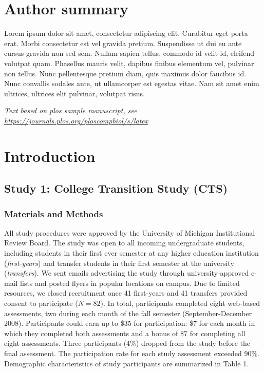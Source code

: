 \documentclass[10pt,letterpaper]{article}
\begin{document}
\section*{Author summary}
Lorem ipsum dolor sit amet, consectetur adipiscing elit. Curabitur eget
porta erat. Morbi consectetur est vel gravida pretium. Suspendisse ut
dui eu ante cursus gravida non sed sem. Nullam sapien tellus, commodo id
velit id, eleifend volutpat quam. Phasellus mauris velit, dapibus
finibus elementum vel, pulvinar non tellus. Nunc pellentesque pretium
diam, quis maximus dolor faucibus id. Nunc convallis sodales ante, ut
ullamcorper est egestas vitae. Nam sit amet enim ultrices, ultrices elit
pulvinar, volutpat risus.

\linenumbers

\emph{Text based on plos sample manuscript, see
\url{https://journals.plos.org/ploscompbiol/s/latex}}

\hypertarget{introduction}{%
\section{Introduction}\label{introduction}}

\hypertarget{study-1-college-transition-study-cts}{%
\subsection{Study 1: College Transition Study
(CTS)}\label{study-1-college-transition-study-cts}}

\hypertarget{materials-and-methods}{%
\subsubsection{Materials and Methods}\label{materials-and-methods}}

All study procedures were approved by the University of Michigan
Institutional Review Board. The study was open to all incoming
undergraduate students, including students in their first ever semester
at any higher education institution (\emph{first-years}) and transfer
students in their first semester at the university (\emph{transfers}).
We sent emails advertising the study through university-approved e-mail
lists and posted flyers in popular locations on campus. Due to limited
resources, we closed recruitment once 41 first-years and 41 transfers
provided consent to participate (\(N=82\)). In total, participants
completed eight web-based assessments, two during each month of the fall
semester (September-December 2008). Participants could earn up to \$35
for participation: \$7 for each month in which they completed both
assessments and a bonus of \$7 for completing all eight assessments.
Three participants (4\%) dropped from the study before the final
assessment. The participation rate for each study assessment exceeded
90\%. Demographic characteristics of study participants are summarized
in Table 1.
\end{document}
